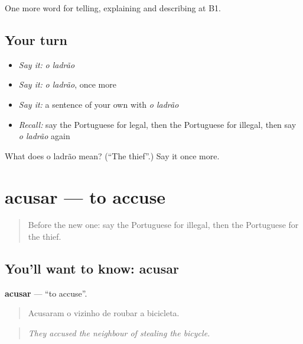 \begin{grammarlens}[title={What you've built}]
One more word for telling, explaining and describing at B1.
\end{grammarlens}

\subsection*{Your turn}
\begin{itemize}
\raggedright
  \item \emph{Say it:} \emph{o ladrão}
  \item \emph{Say it:} \emph{o ladrão}, once more
  \item \emph{Say it:} a sentence of your own with \emph{o ladrão}
  \item \emph{Recall:} say the Portuguese for legal, then the Portuguese for illegal, then say \emph{o ladrão} again
\end{itemize}

\begin{tcolorbox}[breakable,colback=teal!4,colframe=teal!35!black,title={Before you move on}]
What does o ladrão mean? (\textquotedblleft{}The thief\textquotedblright{}.) Say it once more.
\end{tcolorbox}
\section[acusar]{acusar — to accuse}

\label{lesson:PT-C386-acusar}



\begin{quote}
Before the new one: say the Portuguese for illegal, then the Portuguese for the thief.
\end{quote}

\subsection*{You'll want to know: acusar}
\textbf{acusar} — \textquotedblleft{}to accuse\textquotedblright{}.

\begin{quote}
Acusaram o vizinho de roubar a bicicleta.
\end{quote}

\begin{quote}
\emph{They accused the neighbour of stealing the bicycle.}
\end{quote}

